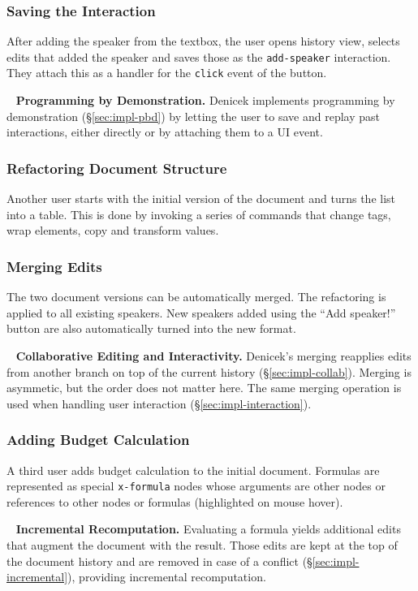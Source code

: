 \documentclass[sigconf]{acmart}
\newcommand*\circled[1]{\textnormal{\footnotesize\sffamily\bfseries\protect\tikz[baseline=(char.base)]{
  \node[shape=circle,fill=black,text=white,draw,inner sep=1pt] (char) {#1};}}}
\DeclareRobustCommand{\keyideabox}[3]{\begin{tcolorbox}[breakable,
  boxsep=5pt,left=0pt,right=0pt,top=0pt,bottom=0pt,width=\dimexpr\columnwidth\relax,
  colback=gray!20,colframe=gray!20,
  enlarge bottom by=0pt,enlarge top by=0pt,
  arc=0pt,outer arc=0pt]
\lettrine[lraise=0.3]{\LARGE #1}{~}
\small \textbf{#2.} #3
\end{tcolorbox}
}
\begin{document}
\subsubsection*{\circled{C} Saving the Interaction} After adding the speaker from the textbox,
the user opens history view, selects edits that added the speaker and saves those as the
{\small\Verb_add-speaker_} interaction. They attach this as a handler for the {\small\Verb_click_} event of the button.

\keyideabox{\faLightbulbO}{Programming by Demonstration}{Denicek implements programming by
demonstration (\S\ref{sec:impl-pbd}) by letting the user to save and replay past interactions,
either directly or by attaching them to a UI event.}

\subsubsection*{\circled{D} Refactoring Document Structure} Another user starts with the initial
version of the document and turns the list into a table. This is done by invoking a series of
commands that change tags, wrap elements, copy and transform values.

\subsubsection*{\circled{E} Merging Edits} The two document versions can be automatically merged.
The refactoring is applied to all existing speakers. New speakers added using the ``Add speaker!''
button are also automatically turned into the new format.

\keyideabox{\faLightbulbO}{Collaborative Editing and Interactivity}{Denicek's merging
reapplies edits from another branch on top of the current history (\S\ref{sec:impl-collab}).
Merging is asymmetic, but the order does not matter here. The same merging operation is used
when handling user interaction (\S\ref{sec:impl-interaction}).}

\subsubsection*{\circled{F} Adding Budget Calculation} A third user adds budget calculation to
the initial document. Formulas are represented as special {\small\Verb_x-formula_} nodes whose arguments
are other nodes or references to other nodes or formulas (highlighted on mouse hover).

\keyideabox{\faLightbulbO}{Incremental Recomputation}{Evaluating a formula yields additional
edits that augment the document with the result. Those edits are kept
at the top of the document history and are removed in case of a conflict (\S\ref{sec:impl-incremental}),
providing incremental recomputation.}
\end{document}
